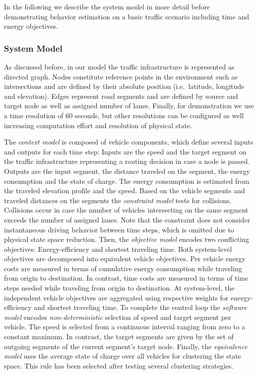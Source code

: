 \documentclass[conference]{../cls/IEEEtran}
\begin{document}
In the following we describe the system model in more detail before demonstrating behavior estimation on a basic traffic scenario including time and energy objectives.

\subsubsection*{System Model}

As discussed before, in our model the traffic infrastructure is represented as directed graph. Nodes constitute reference points in the environment such as intersections and are defined by their absolute position (i.e.\ latitude, longitude and elevation). Edges represent road segments and are defined by source and target node as well as assigned number of lanes. Finally, for demonstration we use a time resolution of 60 seconds, but other resolutions can be configured as well increasing computation effort and resolution of physical state.

The \textit{context model} is composed of vehicle components, which define several inputs and outputs for each time step: Inputs are the speed and the target segment on the traffic infrastructure representing a routing decision in case a node is passed. Outputs are the input segment, the distance traveled on the segment, the energy consumption and the state of charge. The energy consumption is estimated from the traveled elevation profile and the speed. Based on the vehicle segments and traveled distances on the segments the \textit{constraint model} tests for collisions. Collisions occur in case the number of vehicles intersecting on the same segment exceeds the number of assigned lanes. Note that the constraint does not consider instantaneous driving behavior between time steps, which is omitted due to physical state space reduction. Then, the \textit{objective model} encodes two conflicting objectives: Energy-efficiency and shortest traveling time. Both system-level objectives are decomposed into equivalent vehicle objectives. Per vehicle energy costs are measured in terms of cumulative energy consumption while traveling from origin to destination. In contrast, time costs are measured in terms of time steps needed while traveling from origin to destination. At system-level, the independent vehicle objectives are aggregated using respective weights for energy-efficiency and shortest traveling time. To complete the control loop the \textit{software model} encodes \textit{non-deterministic} selection of speed and target segment per vehicle. The speed is selected from a continuous interval ranging from zero to a constant maximum. In contrast, the target segments are given by the set of outgoing segments of the current segment's target node. Finally, the \textit{equivalence model} uses the average state of charge over all vehicles for clustering the state space. This rule has been selected after testing several clustering strategies.
\end{document}
